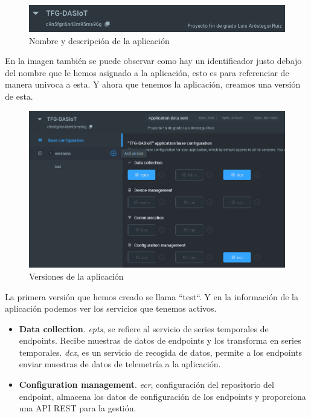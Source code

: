 {\begin{figure}[hb!]
    \centering
    \includegraphics[width=\linewidth]{imagenes/app-creada.png}
    \caption{Nombre y descripción de la aplicación}
    \label{fig:figure6}
\end{figure}

En la imagen también se puede observar como hay un identificador justo debajo del nombre que le hemos asignado a la aplicación, esto es para referenciar de manera univoca a esta. Y ahora que tenemos la aplicación, creamos una versión de esta.

\begin{figure}[ht!]
    \centering
    \includegraphics[width=\linewidth]{imagenes/app-version.png}
    \caption{Versiones de la aplicación}
    \label{fig:figure7}
\end{figure}

La primera versión que hemos creado se llama ``test``. Y en la información de la aplicación podemos ver los servicios que tenemos activos.

\begin{itemize}
    \item \textbf{Data collection}. \textit{epts}, se refiere al servicio de series temporales de endpoints. Recibe muestras de datos de endpoints y los transforma en series temporales. \textit{dcx}, es un servicio de recogida de datos, permite a los endpoints enviar muestras de datos de telemetría a la aplicación.
    \item \textbf{Configuration management}. \textit{ecr}, configuración del repositorio del endpoint, almacena los datos de configuración de los endpoints y proporciona una API REST para la gestión.
\end{itemize}

}
